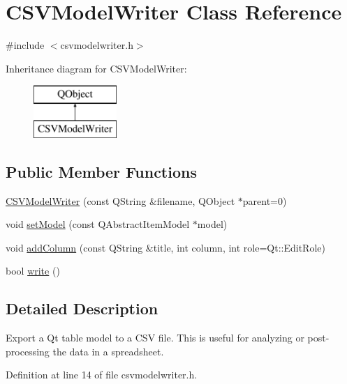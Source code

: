 \hypertarget{class_c_s_v_model_writer}{}\section{C\+S\+V\+Model\+Writer Class Reference}
\label{class_c_s_v_model_writer}


{\ttfamily \#include $<$csvmodelwriter.\+h$>$}

Inheritance diagram for C\+S\+V\+Model\+Writer\+:\begin{figure}[H]
\begin{center}
\leavevmode
\includegraphics[height=2.000000cm]{class_c_s_v_model_writer}
\end{center}
\end{figure}
\subsection*{Public Member Functions}
\begin{DoxyCompactItemize}
\item 
\hyperlink{class_c_s_v_model_writer_a343d5ebba512dea41a62e11e45a6d175}{C\+S\+V\+Model\+Writer} (const Q\+String \&filename, Q\+Object $\ast$parent=0)
\item 
void \hyperlink{class_c_s_v_model_writer_a7b8be6f49a66b965a94a89c78fb96e40}{set\+Model} (const Q\+Abstract\+Item\+Model $\ast$model)
\item 
void \hyperlink{class_c_s_v_model_writer_a9e5f0d60f2c873747582ce21ddeb53b5}{add\+Column} (const Q\+String \&title, int column, int role=Qt\+::\+Edit\+Role)
\item 
bool \hyperlink{class_c_s_v_model_writer_a71fe52fdd6f41c506f9631175cb04615}{write} ()
\end{DoxyCompactItemize}


\subsection{Detailed Description}
Export a Qt table model to a C\+S\+V file. This is useful for analyzing or post-\/processing the data in a spreadsheet. 

Definition at line 14 of file csvmodelwriter.\+h.



